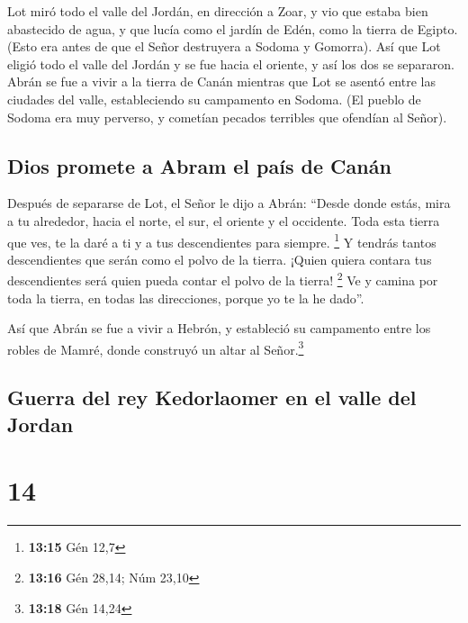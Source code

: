  Lot miró todo el valle del Jordán, en dirección a Zoar,
y vio que estaba bien abastecido de agua, y que lucía como el jardín de
Edén, como la tierra de Egipto. (Esto era antes de que el Señor
destruyera a Sodoma y Gomorra).  Así que Lot eligió todo
el valle del Jordán y se fue hacia el oriente, y así los dos se
separaron.  Abrán se fue a vivir a la tierra de Canán
mientras que Lot se asentó entre las ciudades del valle, estableciendo
su campamento en Sodoma.  (El pueblo de Sodoma era muy
perverso, y cometían pecados terribles que ofendían al Señor).

\hypertarget{dios-promete-a-abram-el-pauxeds-de-canuxe1n}{%
\subsection{Dios promete a Abram el país de
Canán}\label{dios-promete-a-abram-el-pauxeds-de-canuxe1n}}

 Después de separarse de Lot, el Señor le dijo a Abrán:
``Desde donde estás, mira a tu alrededor, hacia el norte, el sur, el
oriente y el occidente.  Toda esta tierra que ves, te la
daré a ti y a tus descendientes para siempre. \footnote{\textbf{13:15}
  Gén 12,7}  Y tendrás tantos descendientes que serán
como el polvo de la tierra. ¡Quien quiera contara tus descendientes será
quien pueda contar el polvo de la tierra! \footnote{\textbf{13:16} Gén
  28,14; Núm 23,10}  Ve y camina por toda la tierra, en
todas las direcciones, porque yo te la he dado''.

 Así que Abrán se fue a vivir a Hebrón, y estableció su
campamento entre los robles de Mamré, donde construyó un altar al
Señor.\footnote{\textbf{13:18} Gén 14,24}

\hypertarget{guerra-del-rey-kedorlaomer-en-el-valle-del-jordan}{%
\subsection{Guerra del rey Kedorlaomer en el valle del
Jordan}\label{guerra-del-rey-kedorlaomer-en-el-valle-del-jordan}}

\hypertarget{section-13}{%
\section{14}\label{section-13}}

